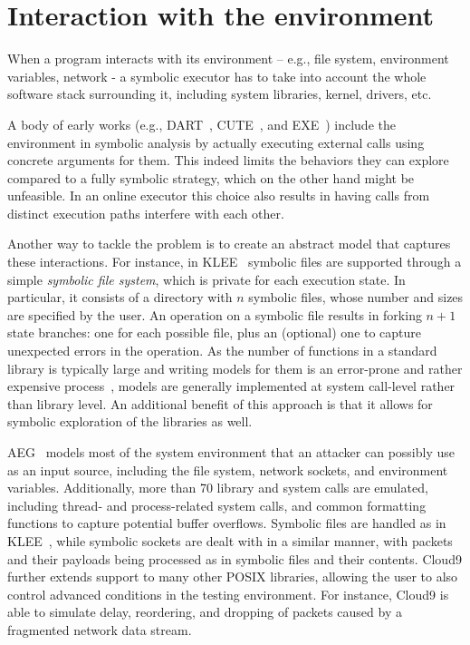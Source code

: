 
\section{Interaction with the environment}

When a program interacts with its environment -- e.g., file system, environment variables, network - a symbolic executor has to take into account the whole software stack surrounding it, including system libraries, kernel, drivers, etc.

A body of early works (e.g., {\sc DART}~\cite{DART-PLDI05}, {\sc CUTE}~\cite{CUTE-FSE13}, and {\sc EXE}~\cite{EXE-CCS06}) include the environment in symbolic analysis by actually executing external calls using concrete arguments for them. This indeed limits the behaviors they can explore compared to a fully symbolic strategy, which on the other hand might be unfeasible. In an online executor this choice also results in having calls from distinct execution paths interfere with each other. 

Another way to tackle the problem is to create an abstract model that captures these interactions. For instance, in {\sc KLEE}~\cite{KLEE-OSDI08} symbolic files are supported through a simple {\em symbolic file system}, which is private for each execution state. In particular, it consists of a directory with $n$ symbolic files, whose number and sizes are specified by the user. An operation on a symbolic file results in forking $n+1$ state branches: one for each possible file, plus an (optional) one to capture unexpected errors in the operation. As the number of functions in a standard library is typically large and writing models for them is an error-prone and rather expensive process~\cite{Ball06}, models are generally implemented at system call-level rather than library level. An additional benefit of this approach is that it allows for symbolic exploration of the libraries as well.

{\sc AEG}~\cite{AEG-NDSS11} models most of the system environment that an attacker can possibly use as an input source, including the file system, network sockets, and environment variables. Additionally, more than 70 library and system calls are emulated, including thread- and process-related system calls, and common formatting functions to capture potential buffer overflows. Symbolic files are handled as in {\sc KLEE}~\cite{KLEE-OSDI08}, while symbolic sockets are dealt with in a similar manner, with packets and their payloads being processed as in symbolic files and their contents. {\sc Cloud9} further extends support to many other POSIX libraries, allowing the user to also control advanced conditions in the testing environment. For instance,  {\sc Cloud9} is able to simulate delay, reordering, and dropping of packets caused by a fragmented network data stream.

